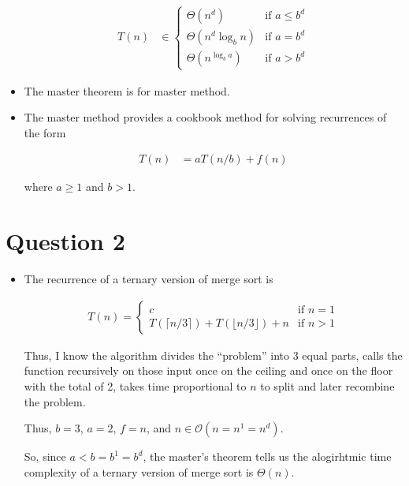 \documentclass[12pt]{article}
\begin{document}
\begin{itemize}
    \begin{align}
        T(n) &\in \begin{cases}
        \Theta(n^d) & \text{if $a \leq b^d$}\\
        \Theta(n^d\log_b n) & \text{if $a = b^d$}\\
        \Theta(n^{\log_b a}) & \text{if $a > b^d$}
        \end{cases}
    \end{align}

    \item The master theorem is for master method.
    \item The master method provides a cookbook method for solving recurrences
    of the form

    \begin{align}
        T(n) &= aT(n/b) + f(n)
    \end{align}

    \bigskip

    where $a \geq 1$ and $b > 1$.
\end{itemize}

\bigskip

\section*{Question 2}

\bigskip

\begin{itemize}
    \item
    \setcounter{equation}{0}
    \bigskip

    The recurrence of a ternary version of merge sort is

    \begin{align}
        T(n) = \begin{cases}
        c    & \text{if $n = 1$}\\
        T(\lceil n/3 \rceil) + T(\lfloor n/3 \rfloor) + n & \text{if $n > 1$}
        \end{cases}
    \end{align}

    \bigskip

    Thus, I know the algorithm divides the ``problem'' into 3 equal parts, calls
    the function recursively on those input once on the ceiling and once on the floor with
    the total of 2, takes time proportional to $n$ to split and later recombine
    the problem.

    \bigskip

    Thus, $b = 3$, $a = 2$, $f = n$, and $n \in \mathcal{O}(n = n^1 = n^d)$.

    \bigskip

    So, since $a < b = b^1 = b^d$, the master's theorem tells us the alogirhtmic
    time complexity of a ternary version of merge sort is $\Theta(n)$.
\end{itemize}
\end{document}

